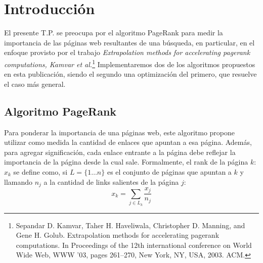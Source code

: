 \section{Introducción}

El presente T.P. se preocupa por el algoritmo PageRank para medir la importancia de las páginas web resultantes de una búsqueda, en particular, en el enfoque provisto por el trabajo  
\emph{Extrapolation methods for accelerating pagerank computations, Kamvar et al.}\footnote{Sepandar D. Kamvar, Taher H. Haveliwala, Christopher D. Manning, and Gene H. Golub. Extrapolation methods for accelerating pagerank computations. In Proceedings of the 12th international conference on World Wide Web, WWW ’03, pages 261–270, New York, NY, USA, 2003. ACM.} Implementaremos dos de los algoritmos propuestos en esta publicación, siendo el segundo una optimización del primero, que resuelve el caso más general.

\subsection{Algoritmo PageRank}
Para ponderar la importancia de una páginas web, este algoritmo propone utilizar como medida la cantidad de enlaces que apuntan a esa página. Además, para agregar significación, cada enlace entrante a la página debe reflejar la importancia de la página desde la cual sale. Formalmente, el rank  de la página $k$: $x_k$ se define como, si $L = \{1\dots n\}$ es el conjunto de páginas que apuntan a $k$ y llamando $n_j$ a la cantidad de links salientes de la página $j$:
$$x_k = \displaystyle \sum_{j\in L_k} \frac{x_j}{n_j}$$

